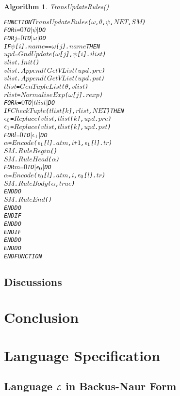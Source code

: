 \documentclass[11pt]{report}
\newenvironment{vverbatim}
{
  \begin{alltt}
}
{
    \vspace{-\baselineskip}
  \end{alltt}
}
\newtheorem{vvalgorithm}{Algorithm}[chapter]
\newenvironment{valgorithm}[2]
{
  \begin{vvalgorithm}{#1}
    \label{#2}
    \small
    \begin{vverbatim}
}
{
    \end{vverbatim}
  \end{vvalgorithm}
}
\begin{document}
          \begin{valgorithm}{TransUpdateRules()}{algo-impln-traup}
FUNCTION \(TransUpdateRules\)(\(\omega\), \(\theta\), \(\psi\), \(NET\), \(SM\))
  FOR \(i\) = \(0\) TO \(|\psi|\) DO
    FOR \(j\) = \(0\) TO \(|\omega|\) DO
      IF \(\psi\)[\(i\)].\(name\) == \(\omega\)[\(j\)].\(name\) THEN
        \(upd\) = \(GndUpdate\)(\(\omega\)[\(j\)], \(\psi\)[\(i\)].\(ilist\))
        \(vlist\).\(Init\)()
        \(vlist\).\(Append\)(\(GetVList\)(\(upd\).\(pre\))
        \(vlist\).\(Append\)(\(GetVList\)(\(upd\).\(pst\))
        \(tlist\) = \(GenTupleList\)(\(\theta\), \(vlist\))
        \(rlist\) = \(NormaliseExp\)(\(\omega\)[\(j\)].\(rexp\))
        FOR \(k\) = \(0\) TO \(|tlist|\) DO
          IF \(CheckTuple\)(\(tlist\)[\(k\)], \(rlist\), \(NET\)) THEN
            \(\epsilon\sb{0}\) = \(Replace\)(\(vlist\), \(tlist\)[\(k\)], \(upd\).\(pre\))
            \(\epsilon\sb{1}\) = \(Replace\)(\(vlist\), \(tlist\)[\(k\)], \(upd\).\(pst\))
            FOR \(l\) = \(0\) TO \(|\)\(\epsilon\sb{1}\)\(|\) DO
              \(\alpha\) = \(Encode\)(\(\epsilon\sb{1}\)[\(l\)].\(atm\), \(i\) + \(1\), \(\epsilon\sb{1}\)[\(l\)].\(tr\))
              \(SM\).\(RuleBegin\)()
              \(SM\).\(RuleHead\)(\(\alpha\))
              FOR \(m\) = \(0\) TO \(|\)\(\epsilon\sb{0}\)\(|\) DO
                \(\alpha\) = \(Encode\)(\(\epsilon\sb{0}\)[\(l\)].\(atm\), \(i\), \(\epsilon\sb{0}\)[\(l\)].\(tr\))
                \(SM\).\(RuleBody\)(\(\alpha\), \(true\))
              ENDDO
              \(SM\).\(RuleEnd\)()
            ENDDO
          ENDIF
        ENDDO
      ENDIF
    ENDDO
  ENDDO
ENDFUNCTION
          \end{valgorithm}

    \section{Discussions}
      \label{sect-impln-discu}

  \chapter{Conclusion}
    \label{chap-concl}

  \appendix

  \chapter{Language Specification}
    \label{chap-langs}

    \section{Language ${\cal L}$ in Backus-Naur Form}
      \label{sect-langs-bnfll}
\end{document}
